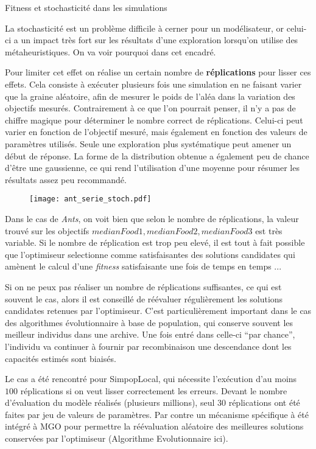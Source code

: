 \begin{testiv}{Fitness et stochasticité dans les simulations}{}

La stochasticité est un problème difficile à cerner pour un modélisateur, or celui-ci a un impact très fort sur les résultats d'une exploration lorsqu'on utilise des métaheuristiques. On va voir pourquoi dans cet encadré. 

Pour limiter cet effet on réalise un certain nombre de \textbf{réplications} pour lisser ces effets. Cela consiste à exécuter plusieurs fois une simulation en ne faisant varier que la graine aléatoire, afin de mesurer le poids de l'aléa dans la variation des objectifs mesurés. Contrairement à ce que l'on pourrait penser, il n'y a pas de chiffre magique pour déterminer le nombre correct de réplications. Celui-ci peut varier en fonction de l'objectif mesuré, mais également en fonction des valeurs de paramètres utilisés. Seule une exploration plus systématique peut amener un début de réponse. La forme de la distribution obtenue a également peu de chance d'être une gaussienne, ce qui rend l'utilisation d'une moyenne pour résumer les résultats assez peu recommandé.

\begin{figure}[H]
		\centering
	 	\texttt{[image: ant\_serie\_stoch.pdf]}
\end{figure}

Dans le cas de \textit{Ants}, on voit bien que selon le nombre de réplications, la valeur trouvé sur les objectifs ${medianFood1, medianFood2, medianFood3}$ est très variable. Si le nombre de réplication est trop peu elevé, il est tout à fait possible que l'optimiseur selectionne comme satisfaisantes des solutions candidates qui amènent le calcul d'une \textit{fitness} satisfaisante une fois de temps en temps ... 

Si on ne peux pas réaliser un nombre de réplications suffisantes, ce qui est souvent le cas, alors il est conseillé de réévaluer régulièrement les solutions candidates retenues par l'optimiseur. C'est particulièrement important dans le cas des algorithmes évolutionnaire à base de population, qui conserve souvent les meilleur individus dans une archive. Une fois entré dans celle-ci \enquote{par chance}, l'individu va continuer à fournir par recombinaison une descendance dont les capacités estimés sont biaisés.

Le cas a été rencontré pour SimpopLocal, qui nécessite l'exécution d'au moins $100$ réplications si on veut lisser correctement les erreurs. Devant le nombre d'évaluation du modèle réalisés (plusieurs millions), seul $30$ réplications ont été faites par jeu de valeurs de paramètres. Par contre un mécanisme spécifique à été intégré à MGO pour permettre la réévaluation aléatoire des meilleures solutions conservées par l'optimiseur (Algorithme Evolutionnaire ici).

\end{testiv}



